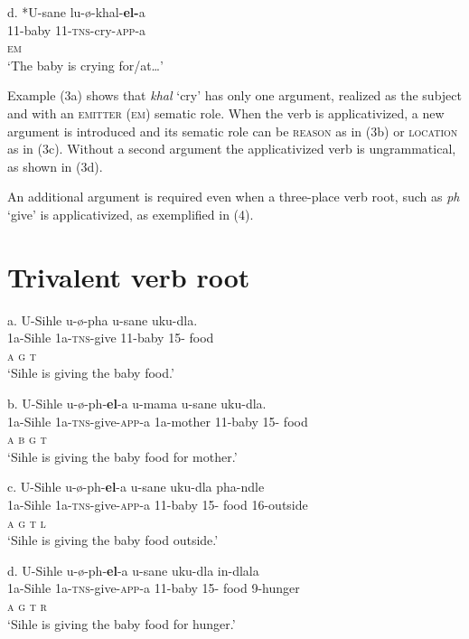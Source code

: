 \gll   d.   *U-sane     lu-ø-khal-\textbf{el-}a     \\
         11-baby       11-\textsc{tns}{}-cry-\textsc{app}{}-a   \\
         \textsc{em}  \\
\glt     ‘The baby is crying for/at…’
\z

Example (3a) shows that \textit{khal} ‘cry’ has only one argument, realized as the subject and with an \textsc{emitter} (\textsc{em}) sematic role. When the verb is applicativized, a new argument is introduced and its sematic role can be \textsc{reason} as in (3b) or \textsc{location} as in (3c). Without a second argument the applicativized verb is ungrammatical, as shown in (3d).

  An additional argument is required even when a three-place verb root, such as \textit{ph} ‘give’ is applicativized, as exemplified in (4). 

\chapter{Trivalent verb root}
\gll   a.    U-Sihle   u-ø-pha      u-sane     uku-dla.    \\
         1a-Sihle   1a-\textsc{tns}{}-give   11-baby     15- food \\
         \textsc{a              g      t}\\
\glt     ‘Sihle is giving the baby food.’
\z

\gll   b.    U-Sihle   u-ø-ph-\textbf{el}{}-a          u-mama   u-sane     uku-dla. \\
         1a-Sihle   1a-\textsc{tns}{}-give-\textsc{app}{}-a   1a-mother  11-baby     15- food \\
         \textsc{a                    b         g      t  }\\
\glt     ‘Sihle is giving the baby food for mother.’
\z

\gll   c.    U-Sihle   u-ø-ph-\textbf{el}{}-a        u-sane    uku-dla   pha-ndle    \\
         1a-Sihle   1a-\textsc{tns}{}-give-\textsc{app}{}-a   11-baby     15- food   16-outside\\
         \textsc{a                  g      t           l}\\
\glt     ‘Sihle is giving the baby food outside.’
\z

\gll   d.    U-Sihle   u-ø-ph-\textbf{el}{}-a        u-sane    uku-dla   in-dlala    \\
         1a-Sihle   1a-\textsc{tns}{}-give-\textsc{app}{}-a   11-baby     15- food   9-hunger\\
         \textsc{a                  g      t      r    }\\
\glt     ‘Sihle is giving the baby food for hunger.’
\z

